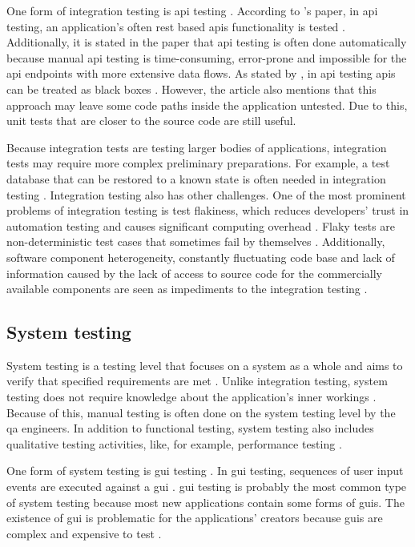 One form of integration testing is \gls{api} testing \cite{vu2018automation}. According to \citeauthor{isha2018automated}'s paper, in \gls{api} testing, an application's often \gls{rest} based \glspl{api} functionality is tested \cite{isha2018automated}. Additionally, it is stated in the paper that \gls{api} testing is often done automatically because manual \gls{api} testing is time-consuming, error-prone and impossible for the \gls{api} endpoints with more extensive data flows. As stated by \citeauthor{bangare2012automated}, in \gls{api} testing \glspl{api} can be treated as black boxes \cite{bangare2012automated}. However, the article also mentions that this approach may leave some code paths inside the application untested. Due to this, unit tests that are closer to the source code are still useful.

Because integration tests are testing larger bodies of applications, integration tests may require more complex preliminary preparations. For example, a test database that can be restored to a known state is often needed in integration testing \cite{bangare2012automated}. Integration testing also has other challenges. One of the most prominent problems of integration testing is test flakiness, which reduces developers' trust in automation testing and causes significant computing overhead \cite{micco2017state}. Flaky tests are non-deterministic test cases that sometimes fail by themselves \cite{bell2018deflaker}. Additionally, software component heterogeneity, constantly fluctuating code base and lack of information caused by the lack of access to source code for the commercially available components are seen as impediments to the integration testing \cite{rehman2006software}.

\subsection{System testing}\label{subsection:system_testing}
System testing is a testing level that focuses on a system as a whole and aims to verify that specified requirements are met \cite{istqb2018system}. Unlike integration testing, system testing does not require knowledge about the application's inner workings \cite{bangare2012automated}. Because of this, manual testing is often done on the system testing level by the \gls{qa} engineers. In addition to functional testing, system testing also includes qualitative testing activities, like, for example, performance testing \cite{binder2000testing}.

One form of system testing is \gls{gui} testing \cite{borjesson2012automated}. In \gls{gui} testing, sequences of user input events are executed against a \gls{gui} \cite{banerjee2013graphical}. \gls{gui} testing is probably the most common type of system testing because most new applications contain some forms of \glspl{gui}. The existence of \gls{gui} is problematic for the applications' creators because \glspl{gui} are complex and expensive to test \cite{miller2001acceptance}.

